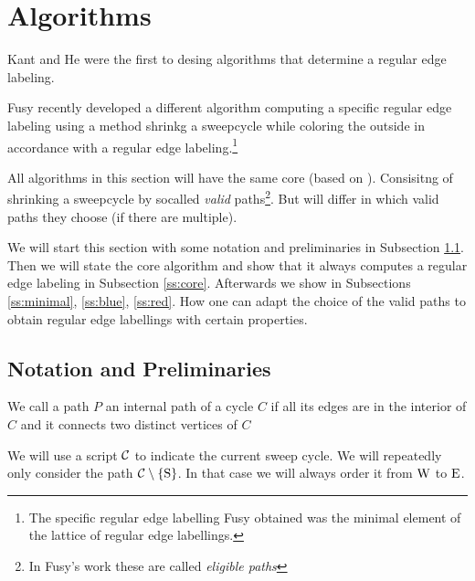 
\newenvironment{invariants}{%
  \refstepcounter{thrm}%
  \paragraph{Invariants~\theprop}%
  \renewcommand*{\theenumi}{\theprop\,(I\arabic{enumi})}%
  \renewcommand*{\labelenumi}{(I\arabic{enumi})}%
  \enumerate
}{%
  \endenumerate
}

\section{Algorithms}
Kant and He \cite{KH} were the first to desing algorithms that determine a regular edge labeling.

Fusy \cite{Fusy2006, Fusy2009} recently developed a different algorithm computing a specific regular edge labeling using a method shrinkg a sweepcycle while coloring the outside in accordance with a regular edge labeling.\footnote{The specific regular edge labelling Fusy obtained was the minimal element of the lattice of regular edge labellings.}

All algorithms in this section will have the same core (based on \cite{Fusy2006}). Consisitng of shrinking a sweepcycle by socalled \emph{valid} paths\footnote{In Fusy's work these are called \emph{eligible paths}}. But will differ in which valid paths they choose (if there are multiple).


We will start this section with some notation and preliminaries in Subsection \ref{ss:not}. Then we will state the core algorithm and show that it always computes a regular edge labeling in Subsection \ref{ss:core}. Afterwards we show in Subsections \ref{ss:minimal}, \ref{ss:blue}, \ref{ss:red}. How one can adapt the choice of the valid paths to obtain regular edge labellings with certain properties. 


\subsection{Notation and Preliminaries}
\label{ss:not}
\begin{defi}
We call a path $P$ an internal path of a cycle $C$ if all its edges are in the interior of $C$ and it connects two distinct vertices of $C$
\end{defi}

We will use a script $\mathcal{C}$ to indicate the current sweep cycle.
We will repeatedly only consider the path $\mathcal{C} \setminus \left\lbrace {\mathrm{S}} \right\rbrace$. In that case we will always order it from $\mathrm{W}$ to $\mathrm{E}$.


